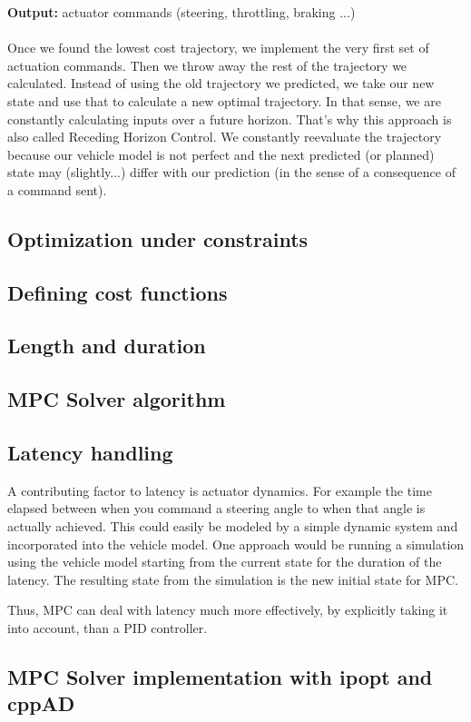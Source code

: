 \documentclass[11pt]{article}
\begin{document}
\textbf{Output:} actuator commands (steering, throttling, braking ...)  \\ \\

Once we found the lowest cost trajectory, we implement the very first set of actuation commands. Then we throw away the rest of the trajectory we calculated. Instead of using the old trajectory we predicted, we take our new state and use that to calculate a new optimal trajectory. In that sense, we are constantly calculating inputs over a future horizon. That's why this approach is also called Receding Horizon Control. We constantly reevaluate the trajectory because our vehicle model is not perfect and the next predicted (or planned) state may (slightly...) differ with our prediction (in the sense of a consequence of a command sent).  

\subsection{Optimization under constraints}

\subsection{Defining cost functions}
\subsection{Length and duration}
\subsection{MPC Solver algorithm}

\subsection{Latency handling}

A contributing factor to latency is actuator dynamics. For example the time elapsed between when you command a steering angle to when that angle is actually achieved. This could easily be modeled by a simple dynamic system and incorporated into the vehicle model. One approach would be running a simulation using the vehicle model starting from the current state for the duration of the latency. The resulting state from the simulation is the new initial state for MPC.

Thus, MPC can deal with latency much more effectively, by explicitly taking it into account, than a PID controller.

\subsection{MPC Solver implementation with ipopt and cppAD}
\end{document}
